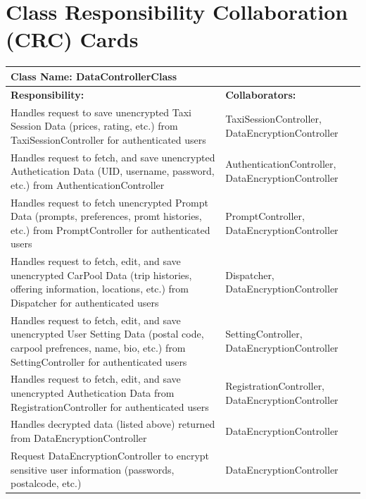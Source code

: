 \documentclass[]{article}
\begin{document}
	
\section{Class Responsibility Collaboration (CRC) Cards}
\label{sec:class_responsibility_collaboration_crc_cards}

	\begin{table}[H]
	\centering
	\begin{tabular}{|p{6cm}|p{6cm}|}
	\hline 
		\multicolumn{2}{|l|}{\textbf{Class Name: DataControllerClass}} \\
	\hline
	\textbf{Responsibility:} & \textbf{Collaborators:} \\
	\hline 
	Handles request to save unencrypted Taxi Session Data (prices, rating, etc.) from TaxiSessionController for authenticated users & TaxiSessionController, DataEncryptionController\\ \hline 
	Handles request to fetch, and save unencrypted Authetication Data (UID, username, password, etc.) from AuthenticationController &AuthenticationController, DataEncryptionController\\ \hline 
	Handles request to fetch unencrypted Prompt Data (prompts, preferences, promt histories, etc.) from PromptController for authenticated users &PromptController, DataEncryptionController\\ \hline 
	Handles request to fetch, edit, and save unencrypted CarPool Data (trip histories, offering information, locations, etc.) from Dispatcher for authenticated users &Dispatcher, DataEncryptionController\\ \hline 
	Handles request to fetch, edit, and save unencrypted User Setting Data (postal code, carpool prefrences, name, bio, etc.) from SettingController for authenticated users&SettingController, DataEncryptionController\\ \hline 
	Handles request to fetch, edit, and save unencrypted Authetication Data from RegistrationController for authenticated users &RegistrationController, DataEncryptionController\\ \hline 
	Handles decrypted data (listed above) returned from DataEncryptionController & DataEncryptionController\\ \hline 
	Request DataEncryptionController to encrypt sensitive user information (passwords, postalcode, etc.) & DataEncryptionController\\ \hline 
	\end{tabular}
	\end{table}
\end{document}
